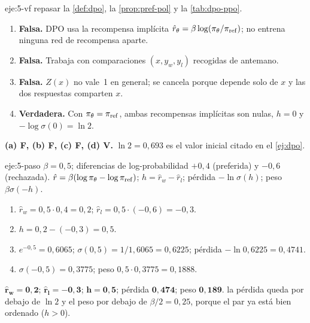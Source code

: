 \begin{solucion}{eje:5-vf}
\planteamiento repasar la \cref{def:dpo}, la \cref{prop:pref-pol} y la \cref{tab:dpo-ppo}.
\pasos
\begin{enumerate}[label=(\alph*)]
  \item \textbf{Falsa.} DPO usa la recompensa implícita $\hat r_\theta=\beta\log(\pi_\theta/\pi_{\mathrm{ref}})$; no entrena ninguna red de recompensa aparte.
  \item \textbf{Falsa.} Trabaja con comparaciones $(x,y_w,y_l)$ recogidas de antemano.
  \item \textbf{Falsa.} $Z(x)$ no vale~1 en general; se cancela porque depende solo de $x$ y las dos respuestas comparten $x$.
  \item \textbf{Verdadera.} Con $\pi_\theta=\pi_{\mathrm{ref}}$, ambas recompensas implícitas son nulas, $h=0$ y $-\log\sigma(0)=\ln 2$.
\end{enumerate}
\resultado \textbf{(a) F, (b) F, (c) F, (d) V.}
\comprobacion $\ln 2=0{,}693$ es el valor inicial citado en el \cref{ej:dpo}.
\end{solucion}

\begin{solucion}{eje:5-paso}
\datos $\beta=0{,}5$; diferencias de log-probabilidad $+0{,}4$ (preferida) y $-0{,}6$ (rechazada).
\planteamiento $\hat r=\beta(\log\pi_\theta-\log\pi_{\mathrm{ref}})$; $h=\hat r_w-\hat r_l$; pérdida $-\ln\sigma(h)$; peso $\beta\sigma(-h)$.
\pasos
\begin{enumerate}[label=\arabic*.]
  \item $\hat r_w=0{,}5\cdot 0{,}4=0{,}2$; $\hat r_l=0{,}5\cdot(-0{,}6)=-0{,}3$.
  \item $h=0{,}2-(-0{,}3)=0{,}5$.
  \item $e^{-0{,}5}=0{,}6065$; $\sigma(0{,}5)=1/1{,}6065=0{,}6225$; pérdida $-\ln 0{,}6225=0{,}4741$.
  \item $\sigma(-0{,}5)=0{,}3775$; peso $0{,}5\cdot 0{,}3775=0{,}1888$.
\end{enumerate}
\resultado $\mathbf{\hat r_w=0{,}2}$; $\mathbf{\hat r_l=-0{,}3}$; $\mathbf{h=0{,}5}$; pérdida $\mathbf{0{,}474}$; peso $\mathbf{0{,}189}$.
\comprobacion la pérdida queda por debajo de $\ln 2$ y el peso por debajo de $\beta/2=0{,}25$, porque el par ya está bien ordenado ($h>0$).
\end{solucion}

